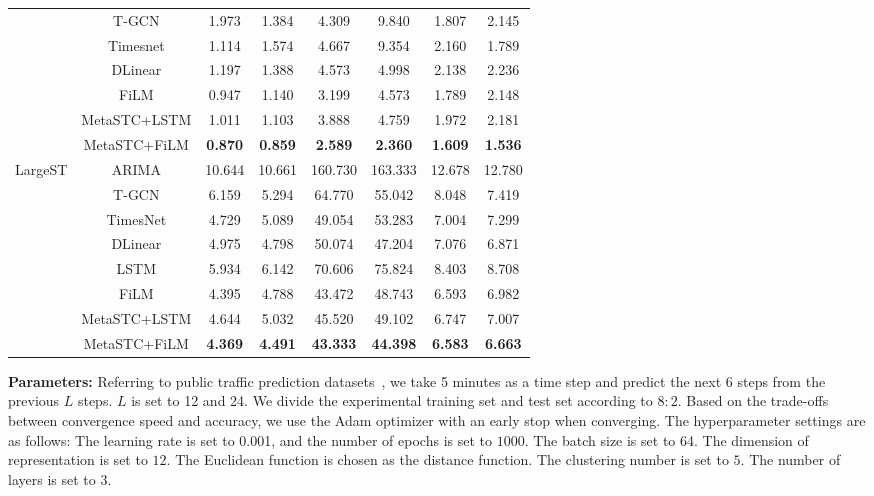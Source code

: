 \documentclass[lettersize,journal]{IEEEtran}
\begin{document}
\begin{table}[!t]
{\begin{tabular}{cccccccc}
    &T-GCN & 1.973 & 1.384 & 4.309 & 9.840 & 1.807 & 2.145 \\
    &Timesnet & 1.114 & 1.574 & 4.667 & 9.354 & 2.160 & 1.789 \\
    &DLinear & 1.197 & 1.388 & 4.573 & 4.998 & 2.138 & 2.236 \\
    &FiLM & 0.947 & 1.140 & 3.199 & 4.573 & 1.789 & 2.148 \\
    &MetaSTC+LSTM & 1.011 & 1.103 & 3.888 & 4.759 & 1.972 & 2.181  \\
    &MetaSTC+FiLM & \textbf{0.870} & \textbf{0.859} & \textbf{ 2.589} & \textbf{2.360} & \textbf{1.609}& \textbf{1.536}  \\
    
    \midrule
    LargeST & ARIMA & 10.644 & 10.661 & 160.730 & 163.333 & 12.678 & 12.780 \\
    &T-GCN & 6.159 & 5.294 & 64.770 & 55.042 & 8.048 & 7.419 \\
    &TimesNet & 4.729 & 5.089 &49.054 &53.283 &7.004 & 7.299  \\
    &DLinear & 4.975 & 4.798 & 50.074 & 47.204 & 7.076 & 6.871 \\
    &LSTM & 5.934 & 6.142 & 70.606 & 75.824 & 8.403 & 8.708\\
    & FiLM & 4.395 & 4.788 & 43.472 & 48.743 & 6.593 & 6.982  \\
    &MetaSTC+LSTM & 4.644 & 5.032 & 45.520 & 49.102 & 6.747 & 7.007  \\
    &MetaSTC+FiLM &\textbf{ 4.369} &\textbf{ 4.491} & \textbf{43.333 }& \textbf{44.398 }&\textbf{ 6.583 }& \textbf{6.663}\\
    \bottomrule  
    \end{tabular}}
\end{table}

\textbf{Parameters:}
Referring to public traffic prediction datasets~\cite{PeMSD}, we take 5 minutes as a time step and predict the next $6$ steps from the previous $L$ steps. $L$ is set to 12 and 24. We divide the experimental training set and test set according to $8:2$. Based on the trade-offs between convergence speed and accuracy, we use the Adam optimizer with an early stop when converging. The hyperparameter settings are as follows: The learning rate is set to 0.001, and the number of epochs is set to $1000$. The batch size is set to 64. The dimension of representation is set to $12$. The Euclidean function is chosen as the distance function. The clustering number is set to $5$. The number of layers is set to $3$. 
\end{document}
